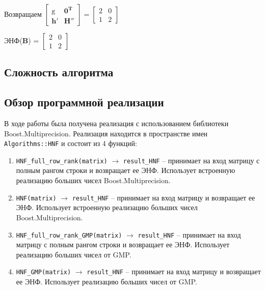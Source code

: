 \begin{enumerate}
Возвращаем $ \left[\begin{array}{cccc}
\mathrm{g} & \mathbf{0}^\mathbf{T} \\
\mathbf{h}' & \mathbf{H}''
\end{array}\right] = \left[\begin{array}{cccc}
2 & 0 \\
1 & 2
\end{array}\right] $
\end{enumerate}

ЭНФ($ \mathbf{B} $) = $ \left[\begin{array}{cccc}
2 & 0 \\
1 & 2
\end{array}\right] $

\subsection{Сложность алгоритма}

\subsection{Обзор программной реализации}

В ходе работы была получена реализация с использованием библиотеки Boost.Multiprecision. Реализация находится в пространстве имен \verb!Algorithms::HNF! и состоит из 4 функций:

\begin{enumerate}

\item \verb!HNF_full_row_rank(matrix)! $\rightarrow$ \verb!result_HNF! -- принимает на вход матрицу с полным рангом строки и возвращает ее ЭНФ. Использует встроенную реализацию больших чисел Boost.Multiprecision.

\item \verb!HNF(matrix)! $\rightarrow$ \verb!result_HNF! -- принимает на вход матрицу и возвращает ее ЭНФ. Использует встроенную реализацию больших чисел Boost.Multiprecision.

\item \verb!HNF_full_row_rank_GMP(matrix)! $\rightarrow$ \verb!result_HNF! -- принимает на вход матрицу с полным рангом строки и возвращает ее ЭНФ. Использует реализацию больших чисел от GMP.

\item \verb!HNF_GMP(matrix)! $\rightarrow$ \verb!result_HNF! -- принимает на вход матрицу и возвращает ее ЭНФ. Использует реализацию больших чисел от GMP.

\end{enumerate}


